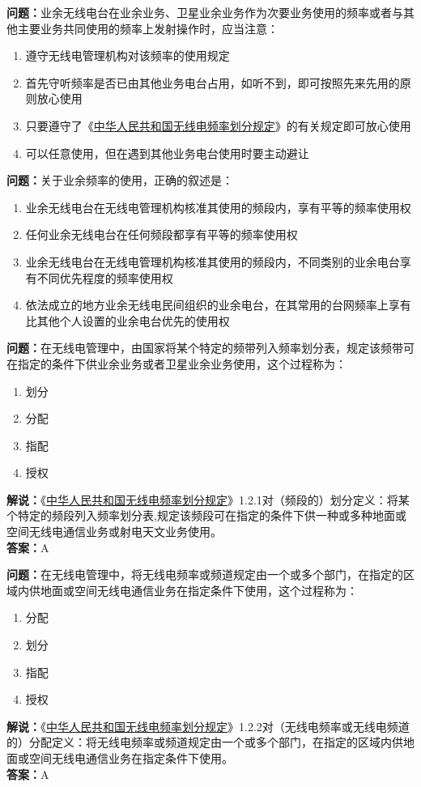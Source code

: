 \textbf{问题：}业余无线电台在业余业务、卫星业余业务作为次要业务使用的频率或者与其他主要业务共同使用的频率上发射操作时，应当注意：
\begin{enumerate}[label=\Alph*), leftmargin=1cm]
	\item 遵守无线电管理机构对该频率的使用规定
	\item 首先守听频率是否已由其他业务电台占用，如听不到，即可按照先来先用的原则放心使用
	\item 只要遵守了《\href{https://www.miit.gov.cn/zwgk/zcwj/wjfb/txy/art/2020/art_066386284cd2449493586c81ccafed11.html}{中华人民共和国无线电频率划分规定}》的有关规定即可放心使用
	\item 可以任意使用，但在遇到其他业务电台使用时要主动避让
\end{enumerate}

\textbf{问题：}关于业余频率的使用，正确的叙述是：
\begin{enumerate}[label=\Alph*), leftmargin=1cm]
	\item 业余无线电台在无线电管理机构核准其使用的频段内，享有平等的频率使用权
	\item 任何业余无线电台在任何频段都享有平等的频率使用权
	\item 业余无线电台在无线电管理机构核准其使用的频段内，不同类别的业余电台享有不同优先程度的频率使用权
	\item 依法成立的地方业余无线电民间组织的业余电台，在其常用的台网频率上享有比其他个人设置的业余电台优先的使用权
\end{enumerate}

\textbf{问题：}在无线电管理中，由国家将某个特定的频带列入频率划分表，规定该频带可在指定的条件下供业余业务或者卫星业余业务使用，这个过程称为：
\begin{enumerate}[label=\Alph*), leftmargin=1cm]
	\item 划分
	\item 分配
	\item 指配
	\item 授权
\end{enumerate}
\textbf{解说：}《\href{https://www.miit.gov.cn/zwgk/zcwj/wjfb/txy/art/2020/art_066386284cd2449493586c81ccafed11.html}{中华人民共和国无线电频率划分规定}》1.2.1对（频段的）划分定义：将某个特定的频段列入频率划分表,规定该频段可在指定的条件下供一种或多种地面或空间无线电通信业务或射电天文业务使用。\\
\textbf{答案：}A

\textbf{问题：}在无线电管理中，将无线电频率或频道规定由一个或多个部门，在指定的区域内供地面或空间无线电通信业务在指定条件下使用，这个过程称为：
\begin{enumerate}[label=\Alph*), leftmargin=1cm]
	\item 分配
	\item 划分
	\item 指配
	\item 授权
\end{enumerate}
\textbf{解说：}《\href{https://www.miit.gov.cn/zwgk/zcwj/wjfb/txy/art/2020/art_066386284cd2449493586c81ccafed11.html}{中华人民共和国无线电频率划分规定}》1.2.2对（无线电频率或无线电频道的）分配定义：将无线电频率或频道规定由一个或多个部门，在指定的区域内供地面或空间无线电通信业务在指定条件下使用。\\
\textbf{答案：}A

